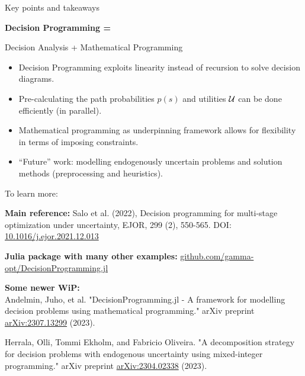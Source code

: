 \documentclass[mathserif,aspectratio=149]{beamer}
\begin{document}
\begin{frame}{Key points and takeaways}
%
\begin{center}
{\bf Decision Programming = 

\alert{Decision} Analysis + Mathematical \alert{Programming}}
\end{center}
\pause
\begin{itemize}
\item Decision Programming exploits \alert{linearity instead of recursion} to solve decision diagrams.
\item Pre-calculating the path probabilities $p(s)$ and utilities ${\cal U}$ \linebreak can be \alert{done efficiently} (in parallel).   
\item Mathematical programming as underpinning framework \linebreak allows for flexibility in terms of \alert{imposing constraints}.
\item ``Future'' work: modelling endogenously uncertain problems and solution methods (preprocessing and heuristics). 
\end{itemize}

\end{frame}


\begin{frame}{To learn more:}

\large

{\bf Main reference: } Salo et al. (2022), Decision programming for multi-stage optimization under uncertainty, EJOR, 299 (2), 550-565. DOI: \href{https://doi.org/10.1016/j.ejor.2021.12.013}{\alert{10.1016/j.ejor.2021.12.013}}

\vfill


{{\bf Julia package with many other examples:} \href{https://github.com/gamma-opt/DecisionProgramming.jl}{\alert{github.com/gamma-opt/DecisionProgramming.jl}}} 

{\bf Some newer WiP:} 
\\
{\small
Andelmin, Juho, et al. "DecisionProgramming.jl - A framework for modelling decision problems using mathematical programming." arXiv preprint \href{https://arxiv.org/abs/2307.13299}{\alert{arXiv:2307.13299}} (2023).}

{\small
Herrala, Olli, Tommi Ekholm, and Fabricio Oliveira. "A decomposition strategy for decision problems with endogenous uncertainty using mixed-integer programming." arXiv preprint \href{https://arxiv.org/abs/arXiv:2304.02338}{\alert{arXiv:2304.02338}} (2023).}

\end{frame}
\end{document}
